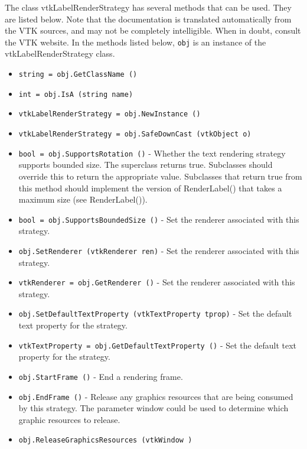 The class vtkLabelRenderStrategy has several methods that can be used.
  They are listed below.
Note that the documentation is translated automatically from the VTK sources,
and may not be completely intelligible.  When in doubt, consult the VTK website.
In the methods listed below, \verb|obj| is an instance of the vtkLabelRenderStrategy class.
\begin{itemize}
\item  \verb|string = obj.GetClassName ()|

\item  \verb|int = obj.IsA (string name)|

\item  \verb|vtkLabelRenderStrategy = obj.NewInstance ()|

\item  \verb|vtkLabelRenderStrategy = obj.SafeDownCast (vtkObject o)|

\item  \verb|bool = obj.SupportsRotation ()| -  Whether the text rendering strategy supports bounded size.
 The superclass returns true. Subclasses should override this to
 return the appropriate value. Subclasses that return true
 from this method should implement the version of RenderLabel()
 that takes a maximum size (see RenderLabel()).

\item  \verb|bool = obj.SupportsBoundedSize ()| -  Set the renderer associated with this strategy.

\item  \verb|obj.SetRenderer (vtkRenderer ren)| -  Set the renderer associated with this strategy.

\item  \verb|vtkRenderer = obj.GetRenderer ()| -  Set the renderer associated with this strategy.

\item  \verb|obj.SetDefaultTextProperty (vtkTextProperty tprop)| -  Set the default text property for the strategy.

\item  \verb|vtkTextProperty = obj.GetDefaultTextProperty ()| -  Set the default text property for the strategy.

\item  \verb|obj.StartFrame ()| -  End a rendering frame.

\item  \verb|obj.EndFrame ()| -  Release any graphics resources that are being consumed by this strategy.
 The parameter window could be used to determine which graphic
 resources to release.

\item  \verb|obj.ReleaseGraphicsResources (vtkWindow )|

\end{itemize}
